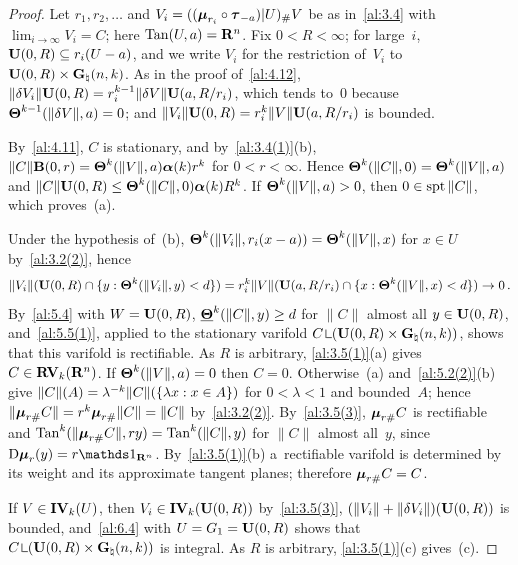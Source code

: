 \begin{proof}
    Let $r_1, r_2, \ldots$ and $V_i = ((\boldsymbol{\mu}_{r_i} \circ \boldsymbol{\tau}_{-a})|U)_\# V$ be as
    in~\ref{al:3.4} with $\lim_{i \to \infty} V_i = C$; here $\operatorname{Tan}(U,a) = \mathbf{R}^{n}$. Fix $0 < R
    < \infty$; for large~$i$, $\mathbf{U}(0,R) \subseteq r_i(U - a)$, and we write $V_i$ for the
    restriction of~$V_i$ to $\mathbf{U}(0,R) \times \mathbf{G}_{\natural}(n,k)$. As in the proof
    of~\ref{al:4.12}, $\|\delta V_i\| \mathbf{U}(0,R) = r_i^{k-1} \|\delta V\| \mathbf{U}(a,R/r_i)$,
    which tends to~$0$ because $\boldsymbol{\Theta}^{k-1}(\|\delta V\|,a) = 0$; and $\|V_i\| \mathbf{U}(0,R)
    = r_i^{k} \|V\| \mathbf{U}(a,R/r_i)$ is bounded.

    By~\ref{al:4.11}, $C$ is stationary, and by~\ref{al:3.4(1)}(b), $\|C\| \mathbf{B}(0,r) =
    \boldsymbol{\Theta}^{k}(\|V\|,a) \boldsymbol{\alpha}(k) r^{k}$ for $0 < r < \infty$. Hence
    $\boldsymbol{\Theta}^{k}(\|C\|,0) = \boldsymbol{\Theta}^{k}(\|V\|,a)$ and $\|C\| \mathbf{U}(0,R) \le
    \boldsymbol{\Theta}^{k}(\|C\|,0) \boldsymbol{\alpha}(k) R^{k}$. If $\boldsymbol{\Theta}^{k}(\|V\|,a) > 0$,
    then $0 \in \operatorname{spt} \|C\|$, which proves~(a).

    Under the hypothesis of~(b), $\boldsymbol{\Theta}^{k}(\|V_i\|, r_i(x-a)) =
    \boldsymbol{\Theta}^{k}(\|V\|,x)$ for $x \in U$ by~\ref{al:3.2(2)}, hence
    \begin{displaymath}
        \|V_i\|(\mathbf{U}(0,R) \cap \{ y : \boldsymbol{\Theta}^{k}(\|V_i\|,y) < d \}) = r_i^{k}
        \|V\|(\mathbf{U}(a,R/r_i) \cap \{ x : \boldsymbol{\Theta}^{k}(\|V\|,x) < d \}) \to 0 \,.
    \end{displaymath}
    By~\ref{al:5.4} with $W = \mathbf{U}(0,R)$, $\boldsymbol{\underline{\Theta}}^{k}(\|C\|,y) \ge d$ for $\|C\|$
    almost all $y \in \mathbf{U}(0,R)$, and~\ref{al:5.5(1)}, applied to the stationary varifold $C
    \restrict (\oball{0}{R} \times \pgrass{\adim}{\vdim})$, shows that this varifold is
    rectifiable. As $R$ is arbitrary, \ref{al:3.5(1)}(a) gives $C \in \mathbf{RV}_{k}(\mathbf{R}^{n})$.
    If $\boldsymbol{\Theta}^{k}(\|V\|,a) = 0$ then $C = 0$. Otherwise~(a) and~\ref{al:5.2(2)}(b) give
    $\|C\|(A) = \lambda^{-k} \|C\|(\{ \lambda x : x \in A \})$ for $0 < \lambda < 1$ and
    bounded~$A$; hence $\|\boldsymbol{\mu}_{r \#} C\| = r^{k} \boldsymbol{\mu}_{r \#} \|C\| = \|C\|$
    by~\ref{al:3.2(2)}. By~\ref{al:3.5(3)}, $\boldsymbol{\mu}_{r \#} C$ is rectifiable and
    $\operatorname{Tan}^{k}(\|\boldsymbol{\mu}_{r \#} C\|, r y) = \operatorname{Tan}^{k}(\|C\|, y)$ for $\|C\|$ almost all~$y$,
    since $\uD \scale{r}(y) = r \id{\R^{\adim}}$. By~\ref{al:3.5(1)}(b) a~rectifiable varifold is
    determined by its weight and its approximate tangent planes; therefore $\boldsymbol{\mu}_{r \#} C = C$.

    If $V \in \mathbf{IV}_{k}(U)$, then $V_i \in \mathbf{IV}_{k}(\mathbf{U}(0,R))$ by~\ref{al:3.5(3)},
    $(\|V_i\| + \|\delta V_i\|)(\mathbf{U}(0,R))$ is bounded, and~\ref{al:6.4} with $U = G_1 =
    \mathbf{U}(0,R)$ shows that $C \restrict (\oball{0}{R} \times \pgrass{\adim}{\vdim})$ is
    integral. As $R$ is arbitrary, \ref{al:3.5(1)}(c) gives~(c).
\end{proof}


